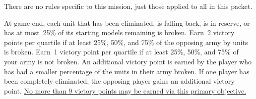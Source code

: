 
\begin{tablesetup}

  \vanguardstrike

\end{tablesetup}

\begin{missionrules}

\bigskip
  There are no rules specific to this mission, just those applied to
  all in this packet.

\end{missionrules}

\begin{scoring}  
\begin{primaries}
  At game end, each unit that has been eliminated, is falling back, is
  in reserve, or has at most~25\% of its starting models remaining is
  broken.  Earn~2 victory points per quartile if at least 25\%, 50\%,
  and 75\% of the opposing army by units is broken.  Earn~1 victory
  point per quartile if at least 25\%, 50\%, and 75\% of your army is
  not broken.  An additional victory point is earned by the player who
  has had a smaller percentage of the units in their army broken.  If
  one player has been completely eliminated, the opposing player gains
  an additional victory point.  \underline{No more than 9 victory
    points may be earned via this primary objective.}
\end{primaries}

\begin{secondaries}
\interrogation
\seekanddestroy
\chosenground
\majoritycontrol
\end{secondaries}

\end{scoring}
